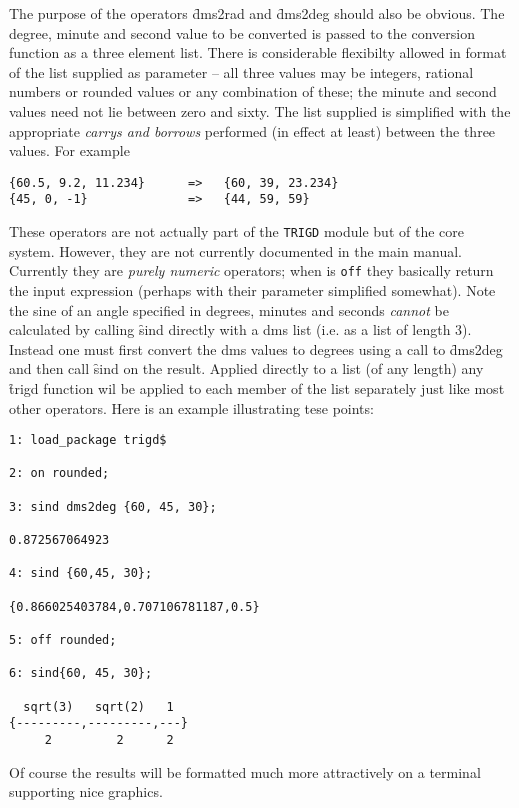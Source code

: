 The purpose of the operators  \f{dms2rad} and \f{dms2deg} should  also be obvious.  The degree, minute and second value to be converted is passed to the conversion function as a three element list.  There is considerable flexibilty allowed in  format of the list supplied as parameter -- all three values may be integers, rational numbers or rounded values or any combination of these; the minute and second values need not lie between zero and sixty.  The list supplied is simplified with the appropriate \textit{carrys and borrows} performed (in effect at least) between the three values.  For example
\begin{verbatim} 
{60.5, 9.2, 11.234}      =>   {60, 39, 23.234}
{45, 0, -1}              =>   {44, 59, 59}
\end{verbatim}

These operators are not actually part of the \texttt{TRIGD} module but of the {\REDUCE} core system. However, they are not currently documented in the main manual.  Currently they are \emph{purely numeric} operators; when  is \texttt{off} they basically return the input expression (perhaps with their parameter simplified somewhat).  
\fi
Note the sine of an angle specified in degrees, minutes and seconds \emph{cannot} be calculated by calling \f{sind} directly with a dms list (i.e. as a list of length 3).  Instead one must first convert the dms values to degrees using a call to \f{dms2deg} and then call \f{sind} on the result.  Applied directly to a list (of any length) any \f{trigd} function wil be applied to each member of the list separately just like most other {\REDUCE} operators. Here is an example illustrating tese points:
\begin{verbatim}
1: load_package trigd$

2: on rounded;

3: sind dms2deg {60, 45, 30};

0.872567064923

4: sind {60,45, 30};

{0.866025403784,0.707106781187,0.5}

5: off rounded;

6: sind{60, 45, 30};

  sqrt(3)   sqrt(2)   1
{---------,---------,---}
     2         2      2

\end{verbatim}
 
Of course the results will be formatted much more attractively on a terminal supporting nice graphics.

